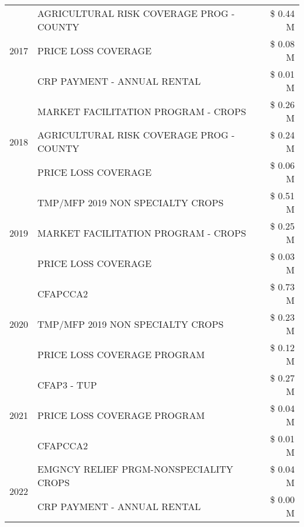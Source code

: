 \begin{tabular}{llr}
\cline{1-3}
\multirow[t]{3}{*}{2017} & AGRICULTURAL RISK COVERAGE PROG - COUNTY & \$ 0.44 M \\
 & PRICE LOSS COVERAGE & \$ 0.08 M \\
 & CRP PAYMENT - ANNUAL RENTAL & \$ 0.01 M \\
\cline{1-3}
\multirow[t]{3}{*}{2018} & MARKET FACILITATION PROGRAM - CROPS & \$ 0.26 M \\
 & AGRICULTURAL RISK COVERAGE PROG - COUNTY & \$ 0.24 M \\
 & PRICE LOSS COVERAGE & \$ 0.06 M \\
\cline{1-3}
\multirow[t]{3}{*}{2019} & TMP/MFP 2019 NON SPECIALTY CROPS & \$ 0.51 M \\
 & MARKET FACILITATION PROGRAM - CROPS & \$ 0.25 M \\
 & PRICE LOSS COVERAGE & \$ 0.03 M \\
\cline{1-3}
\multirow[t]{3}{*}{2020} & CFAPCCA2 & \$ 0.73 M \\
 & TMP/MFP 2019 NON SPECIALTY CROPS & \$ 0.23 M \\
 & PRICE LOSS COVERAGE PROGRAM & \$ 0.12 M \\
\cline{1-3}
\multirow[t]{3}{*}{2021} & CFAP3 - TUP & \$ 0.27 M \\
 & PRICE LOSS COVERAGE PROGRAM & \$ 0.04 M \\
 & CFAPCCA2 & \$ 0.01 M \\
\cline{1-3}
\multirow[t]{2}{*}{2022} & EMGNCY RELIEF PRGM-NONSPECIALITY CROPS & \$ 0.04 M \\
 & CRP PAYMENT - ANNUAL RENTAL & \$ 0.00 M \\
\cline{1-3}
\bottomrule
\end{tabular}

